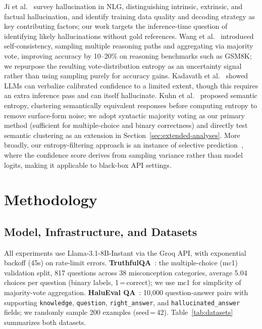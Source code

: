 \documentclass{llncs}
\begin{document}
Ji et al.~\cite{ji2023survey} survey hallucination in NLG, distinguishing
intrinsic, extrinsic, and factual hallucination, and identify training data
quality and decoding strategy as key contributing factors; our work targets
the inference-time question of identifying likely hallucinations without gold
references. Wang et al.~\cite{wang2023selfconsistency} introduced
self-consistency, sampling multiple reasoning paths and aggregating via
majority vote, improving accuracy by 10--20\% on reasoning benchmarks such as
GSM8K; we repurpose the resulting vote-distribution entropy as an uncertainty
signal rather than using sampling purely for accuracy gains. Kadavath et
al.~\cite{kadavath2022language} showed LLMs can verbalize calibrated
confidence to a limited extent, though this requires an extra inference pass
and can itself hallucinate. Kuhn et al.~\cite{kuhn2023semantic} proposed
semantic entropy, clustering semantically equivalent responses before
computing entropy to remove surface-form noise; we adopt syntactic majority
voting as our primary method (sufficient for multiple-choice and binary
correctness) and directly test semantic clustering as an extension in
Section~\ref{sec:extended-analyses}. More broadly, our entropy-filtering
approach is an instance of selective prediction~\cite{kadavath2022language},
where the confidence score derives from sampling variance rather than model
logits, making it applicable to black-box API settings.

\FloatBarrier

\section{Methodology}
\label{sec:method}

\subsection{Model, Infrastructure, and Datasets}

All experiments use Llama-3.1-8B-Instant via the Groq API, with exponential
backoff (45s) on rate-limit errors. \textbf{TruthfulQA}~\cite{lin2022truthfulqa}:
the multiple-choice (mc1) validation split, 817 questions across 38
misconception categories, average 5.04 choices per question (binary labels,
1\,=\,correct); we use mc1 for simplicity of majority-vote aggregation.
\textbf{HaluEval QA}~\cite{ji2023halueval}: 10{,}000 question-answer pairs
with supporting \texttt{knowledge}, \texttt{question}, \texttt{right\_answer},
and \texttt{hallucinated\_answer} fields; we randomly sample 200 examples
(seed\,=\,42). Table~\ref{tab:datasets} summarizes both datasets.
\end{document}

